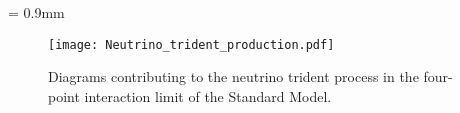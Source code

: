 \unitlength = 0.9mm
\begin{figure}[t]
\centering\texttt{[image: Neutrino\_trident\_production.pdf]}
\caption[Neutrino trident production with a contact approximation.]{Diagrams contributing to the neutrino trident process in the four-point interaction limit of the Standard Model.  
\label{fig:Tdiagrams}}
\end{figure}
